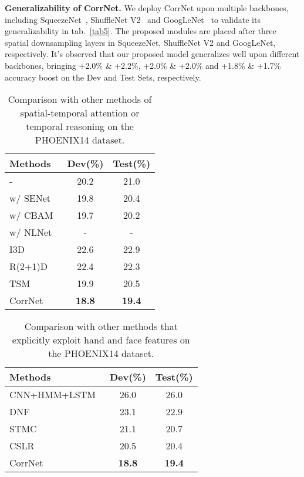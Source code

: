 \documentclass[10pt,twocolumn,letterpaper]{article}
\begin{document}
\textbf{Generalizability of CorrNet.} We deploy CorrNet upon multiple backbones, including SqueezeNet~\cite{hu2018squeeze}, ShuffleNet V2~\cite{ma2018shufflenet} and GoogLeNet~\cite{szegedy2015going} to validate its generalizability in tab.~\ref{tab5}. The proposed modules are placed after three spatial downsampling layers in SqueezeNet, ShuffleNet V2 and GoogLeNet, respectively. It's observed that our proposed model generalizes well upon different backbones, bringing +2.0\% \& +2.2\%, +2.0\% \& +2.0\% and +1.8\% \& +1.7\% accuracy boost on the Dev and Test Sets, respectively.

  \begin{table}[t]   
  \centering
  \setlength\tabcolsep{3pt}
  \begin{tabular}{lcc}
  \hline
  Methods & Dev(\%) & Test(\%)\\
  \hline
  - & 20.2 & 21.0\\
  w/ SENet~\cite{hu2018squeeze}  & 19.8  & 20.4 \\
  w/ CBAM~\cite{woo2018cbam} & 19.7 & 20.2 \\
  w/ NLNet~\cite{wang2018non} & - & -\\
  \hline
  I3D~\cite{carreira2017quo} & 22.6  & 22.9 \\
  R(2+1)D~\cite{tran2018closer}  & 22.4  & 22.3 \\
  TSM~\cite{lin2019tsm} & 19.9 & 20.5 \\
  \hline
  CorrNet & \textbf{18.8} & \textbf{19.4} \\
  \hline
  \end{tabular}
  \caption{Comparison with other methods of spatial-temporal attention or temporal reasoning on the PHOENIX14 dataset.} 
  \label{tab6} 
  \end{table}

\begin{table}[t]   
  \centering
  \setlength\tabcolsep{3pt}
  \begin{tabular}{lcc}
  \hline
  Methods & Dev(\%) & Test(\%)\\
  \hline
  CNN+HMM+LSTM~\cite{koller2019weakly} & 26.0  & 26.0 \\
  DNF~\cite{cui2019deep} & 23.1 & 22.9\\
  STMC~\cite{zhou2020spatial} & 21.1  & 20.7 \\
  CSLR~\cite{zuo2022c2slr} & 20.5  & 20.4 \\
  \hline
  CorrNet & \textbf{18.8} & \textbf{19.4} \\
  \hline
  \end{tabular}
  \caption{Comparison with other methods that explicitly exploit hand and face features on the PHOENIX14 dataset.} 
  \label{tab7} 
  \end{table}
\end{document}
